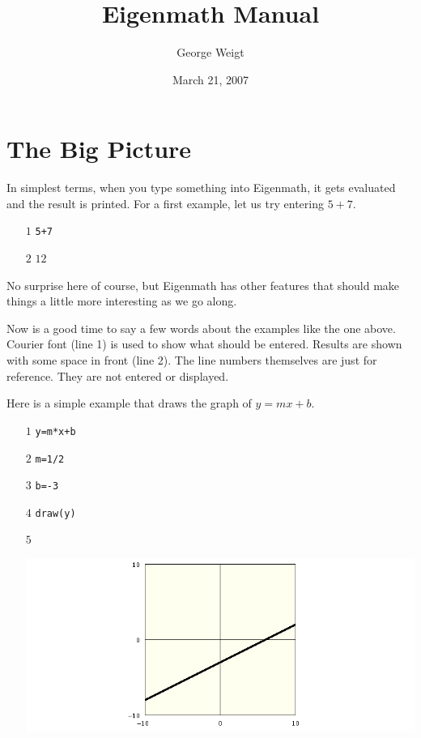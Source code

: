 \documentclass[12pt,openany]{report}
\title{Eigenmath Manual}
\author{George Weigt}
\date{March 21, 2007}
\begin{document}
\maketitle
\tableofcontents

\newpage

\chapter{The Big Picture}
In simplest terms, when you type something into Eigenmath,
it gets evaluated and the result is printed.
For a first example, let us try entering $5+7$.

\medskip
\noindent
\begin{itemize}
\item[$\scriptstyle1$]{\tt 5+7}
\item[$\scriptstyle2$]\hspace{50pt} $12$
\end{itemize}

\medskip
\noindent
No surprise here of course, but Eigenmath has other features
that should make things a little more interesting as we go along.

\medskip
\noindent
Now is a good time to say a few words about the examples like the one above.
Courier font (line 1) is used to show what should be entered.
Results are shown with some space in front (line 2).
The line numbers themselves are just for reference.
They are not entered or displayed.

\newpage

\noindent
Here is a simple example that draws the graph of $y=mx+b$.

\medskip
\noindent
\begin{itemize}
\item[$\scriptstyle1$]{\tt y=m*x+b}
\item[$\scriptstyle2$]{\tt m=1/2}
\item[$\scriptstyle3$]{\tt b=-3}
\item[$\scriptstyle4$]{\tt draw(y)}
\item[$\scriptstyle5$]
\item[]\includegraphics[scale=0.5]{1.png}
\end{itemize}
\end{document}
